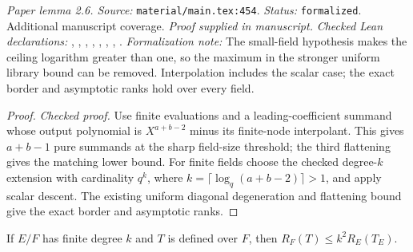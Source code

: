 \noindent\textit{Paper lemma 2.6. Source:} \texttt{material/main.tex:454}.
\textit{Status:} \texttt{formalized}. Additional manuscript coverage.
\textit{Proof supplied in manuscript.}
\textit{Checked Lean declarations:} , , , , , , , .
\textit{Formalization note:} The small-field hypothesis makes the ceiling logarithm greater than one, so the maximum in the stronger uniform library bound can be removed. Interpolation includes the scalar case; the exact border and asymptotic ranks hold over every field.

\begin{proof}
\leanok
{}
\textit{Checked proof.} Use finite evaluations and a leading-coefficient summand whose output polynomial is $X^{a+b-2}$ minus its finite-node interpolant. This gives $a+b-1$ pure summands at the sharp field-size threshold; the third flattening gives the matching lower bound. For finite fields choose the checked degree-$k$ extension with cardinality $q^k$, where $k=\lceil\log_q(a+b-2)\rceil>1$, and apply scalar descent. The existing uniform diagonal degeneration and flattening bound give the exact border and asymptotic ranks.
\end{proof}

\renewcommand{\thetheorem}{2.7}
\begin{equationresult}
\label{eq:extensionscalars}
\leanok
If $E/F$ has finite degree $k$ and $T$ is defined over $F$, then $R_F(T)\le k^2R_E(T_E)$.
\end{equationresult}

